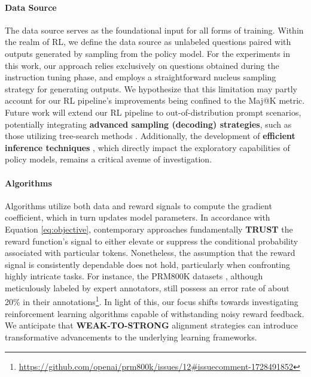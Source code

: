\begin{itemize}[topsep=0pt]
\paragraph{Data Source} The data source serves as the foundational input for all forms of training. Within the realm of RL, we define the data source as unlabeled questions paired with outputs generated by sampling from the policy model. For the experiments in this work, our approach relies exclusively on questions obtained during the instruction tuning phase, and employs a straightforward nucleus sampling strategy for generating outputs. We hypothesize that this limitation may partly account for our RL pipeline’s improvements being confined to the Maj@K metric. Future work will extend our RL pipeline to out-of-distribution prompt scenarios, potentially integrating \textbf{advanced sampling (decoding) strategies}, such as those utilizing tree-search methods \citep{yao2023tree}. Additionally, the development of \textbf{efficient inference techniques} \citep{xia-etal-2023-speculative,leviathan2023fast,kwon2023efficient,xia2024unlocking}, which directly impact the exploratory capabilities of policy models, remains a critical avenue of investigation.

\paragraph{Algorithms} Algorithms utilize both data and reward signals to compute the gradient coefficient, which in turn updates model parameters. In accordance with Equation \ref{eq:objective}, contemporary approaches fundamentally \textbf{TRUST} the reward function's signal to either elevate or suppress the conditional probability associated with particular tokens. Nonetheless, the assumption that the reward signal is consistently dependable does not hold, particularly when confronting highly intricate tasks. For instance, the PRM800K datasets \citep{lightman2023let}, although meticulously labeled by expert annotators, still possess an error rate of about 20\% in their annotations\footnote{\url{https://github.com/openai/prm800k/issues/12\#issuecomment-1728491852}}. In light of this, our focus shifts towards investigating reinforcement learning algorithms capable of withstanding noisy reward feedback. We anticipate that \textbf{WEAK-TO-STRONG} alignment strategies \citep{burns2023weak} can introduce transformative advancements to the underlying learning frameworks.


\end{itemize}
